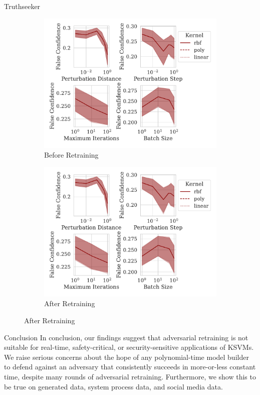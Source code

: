 \documentclass{beamer}
\begin{document}
\begin{frame}{Truthseeker}
\begin{figure}
\begin{subfigure}{0.4\textwidth}
         \centering
         \includegraphics[width=\textwidth]{./truthseeker/confidence_vs_attack_parameters.pdf}
         \caption{Before Retraining}
     \end{subfigure}
     \hfill
     \begin{subfigure}{0.4\textwidth}
         \centering
         \includegraphics[width=\textwidth]{./truthseeker/retrain_confidence_vs_attack_parameters.pdf}
         \caption{After Retraining}
     \end{subfigure}
     \hfill
     \label{fig:truthseeker}
\end{figure}
\end{frame}

\begin{frame}{Conclusion}
  In conclusion, our findings suggest that adversarial retraining is not suitable for real-time, safety-critical, or security-sensitive applications of KSVMs. We raise serious concerns about the hope of any polynomial-time model builder to defend against an adversary that consistently succeeds in more-or-less constant time, despite many rounds of adversarial retraining. Furthermore, we show this to be true on generated data, system process data, and social media data.
\end{frame}
\end{document}
